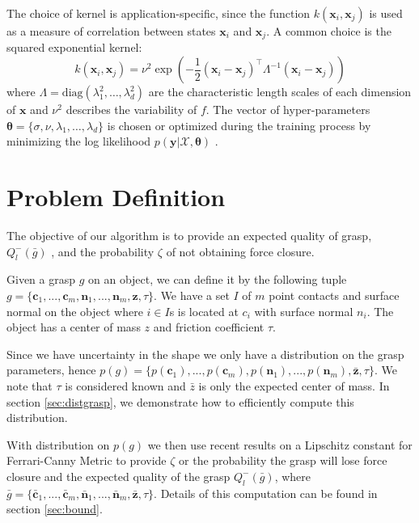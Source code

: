 \documentclass[letterpaper, 10 pt, conference]{ieeeconf}  %
\newcommand{\by}{\mathbf{y}}
\newcommand{\bx}{\mathbf{x}}
\newcommand{\mX}{\mathcal{X}}
\begin{document}
The choice of kernel is application-specific, since the function $k(\bx_i,\bx_j)$ is used as a measure of correlation between states $\bx_i$ and $\bx_j$.
A common choice is the squared exponential kernel:
\begin{equation}
k(\bx_i,\bx_j) 
=
\nu^2\exp(-\frac{1}{2}(\bx_i - \bx_j)^{\intercal}\Lambda^{-1}(\bx_i - \bx_j))
\end{equation}
where $\Lambda= \text{diag}(\lambda_1^2,\ldots,\lambda_d^2)$ are the characteristic length scales of each dimension of $\bx$ and $\nu^2$ describes the variability of $f$.
The vector of hyper-parameters $\boldsymbol{\theta} = \{\sigma,\nu,\lambda_1,\ldots,\lambda_d\}$ is chosen or optimized during the training process by minimizing the log likelihood $p(\by|\mX,\boldsymbol{\theta})$ \cite{rasmussen2006}.


\section{Problem Definition}

The objective of our algorithm is to provide an expected quality of grasp, $Q_l^-(\bar{g})$ \cite{ferrari1992}, and the probability $\zeta$ of not obtaining force closure. 

Given a grasp $g$ on an object, we can define it by the following tuple $g = \lbrace \textbf{c}_1,...,\textbf{c}_m,\textbf{n}_1,...,\textbf{n}_m,\textbf{z},\tau\rbrace$. We have a set $I$ of $m$  point contacts and surface normal on the object where $i \in I$s is located at $c_i$ with surface normal $n_i$. The object has a center of mass $z$ and friction coefficient $\tau$.

Since we have uncertainty in the shape we only have a distribution on the grasp parameters, hence $p(g) = \lbrace p(\textbf{c}_1),...,p(\textbf{c}_m),p(\textbf{n}_1),...,p(\textbf{n}_m),\bar{\textbf{z}},\tau \rbrace$. We note that $\tau$ is considered known and $\bar{z}$ is only the expected center of mass. In section \ref{sec:distgrasp}, we demonstrate how to efficiently compute this distribution. 

With distribution on $p(g)$ we then use recent results on a Lipschitz constant for Ferrari-Canny Metric \cite{pokorny2013classical} to provide $\zeta$ or the probability the grasp will lose force closure and the expected quality of the grasp $Q_l^-(\bar{g})$, where $\bar{g} = \lbrace \bar{\textbf{c}}_1,...,\bar{\textbf{c}}_m,\bar{\textbf{n}}_1,...,\bar{\textbf{n}}_m,\bar{\textbf{z}},\tau \rbrace$. Details of this computation can be found in section \ref{sec:bound}.
\end{document}
